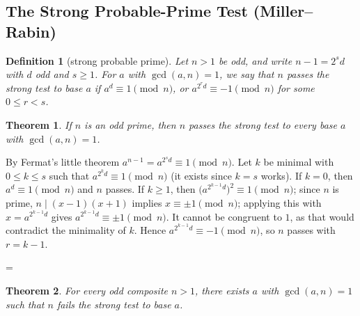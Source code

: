 \documentclass[11pt]{article}
\makeatletter
\theoremstyle{ntstyle}
\newtheorem{theorem}{Theorem}[subsection]
\newtheorem{definition}{Definition}[subsection]
\let\nt@closedisplay\]
\def\nt@guardedclose{\@ifnextchar\par{\nt@closeafterpar}{\@ifnextchar\end{\postdisplaypenalty\@M\nt@closedisplay}{\nt@closedisplay}}}
\def\nt@closeafterpar\par{\@ifnextchar\par{\nt@closeafterpar}{\@ifnextchar\end{\postdisplaypenalty\@M\nt@closedisplay\par}{\nt@closedisplay\par}}}
\renewenvironment{proof}[1][\proofname]{\par
  \pushQED{\qed}\normalfont\topsep\medskipamount\edef\nt@afterproof{\@endparpenalty=\the\@endparpenalty\relax}\@beginparpenalty\@M\@endparpenalty\@M\let\]\nt@guardedclose\trivlist\item[]\textit{#1\@addpunct{.}} \ignorespaces}{\ifvmode\addpenalty\@M\fi\popQED\nt@afterproof\endtrivlist\@endpefalse}
\makeatother
\begin{document}
\subsection{The Strong Probable-Prime Test (Miller--Rabin)}

\begin{definition}[strong probable prime]\label{def:9.4.1} Let
	$n>1$ be odd, and write $n-1=2^{s}d$ with $d$ odd and $s\ge1$. For $a$ with
	$\gcd(a, n)=1$, we say that $n$ passes the strong test to base $a$ if
	$a^{d}\equiv1\pmod{n}$, or $a^{2^{r}d}\equiv-1\pmod{n}$ for some $0\le r<s$.

\end{definition}
\begin{theorem}\label{thm:9.4.1} If $n$ is
	an odd prime, then $n$ passes the strong test to every base $a$ with
	$\gcd(a, n)=1$.

\end{theorem}

\begin{proof} By Fermat's little theorem
	$a^{n-1}=a^{2^{s}d}\equiv1\pmod{n}$. Let $k$ be minimal with $0\le
		k\le s$ such that $a^{2^{k}d}\equiv1\pmod{n}$ (it exists since $k=s$
	works). If $k=0$, then $a^{d}\equiv1\pmod{n}$ and $n$ passes. If
	$k\ge1$, then $\big(a^{2^{k-1}d}\big)^2\equiv1\pmod{n}$; since $n$ is
	prime, $n\mid(x-1)(x+1)$ implies $x\equiv\pm1\pmod{n}$; applying this
	with $x=a^{2^{k-1}d}$ gives
	$a^{2^{k-1}d}\equiv\pm1\pmod{n}$. It cannot be congruent to $1$, as that
	would contradict the minimality of $k$. Hence
	$a^{2^{k-1}d}\equiv-1\pmod{n}$, so $n$ passes with $r=k-1$.

\end{proof}
\begin{theorem}\label{thm:9.4.2} For every odd composite $n>1$, there exists $a$ with
	$\gcd(a, n)=1$ such that $n$ fails the strong test to base $a$.

\end{theorem}
\end{document}
